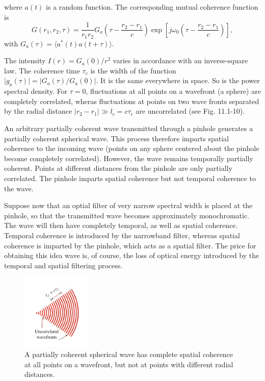 \documentclass{article}
\numberwithin{figure}{subsection}
\numberwithin{table}{subsection}
\begin{document}
where $ a(t) $ is a random function. The corresponding mutual coherence function is 
\begin{equation}
G(r_1, r_2, \tau) = \frac{1}{r_1 r_2} G_a (\tau - \frac{r_2 - r_1}{c}) \exp [j\omega_0 (\tau - \frac{r_2 - r_1}{c})],
\end{equation}
with $ G_a (\tau) = \langle a^\ast (t) a(t+ \tau) \rangle $.
\par The intensity $ I(r) = G_a (0) / r^2 $ varies in accordance with an inverse-square law. The coherence time $ \tau_c $ is the width of the function $ \lvert g_a (\tau) \rvert = \lvert G_a (\tau) / G_a (0) \rvert $. It is the same everywhere in space. So is the power spectral density. For $ \tau =0 $, fluctuations at all points on a wavefront (a sphere) are completely correlated, wheras fluctuations at points on two wave fronts separated by the radial distance $ \lvert r_2 -r_1 \rvert \gg l_c = c\tau_c $ are uncorrelated (see Fig. 11.1-10).
\par An arbitrary partially coherent wave transmitted through a pinhole generates a partially coherent spherical wave. This process therefore imparts spatial coherence to the incoming wave (points on any sphere centered about the pinhole become completely correlated). However, the wave remains temporally partially coherent. Points at different distances from the pinhole are only partially correlated. The pinhole imparts spatial coherence but not temporal coherence to the wave.
\par Suppose now that an optial filter of very narrow spectral width is placed at the pinhole, so that the transmitted wave becomes approximately monochromatic. The wave will then have completely temporal, as well as spatial coherence. Temporal coherence is introduced by the narrowband filter, whereas spatial coherence is imparted by the pinhole, which acts as a spatial filter. The price for obtaining this idea wave is, of course, the loss of optical energy introduced by the temporal and spatial filtering process.
 \begin{figure}[H]
\centering
\includegraphics[width=0.3\textwidth]{11_1_10.PNG}
\caption{A partially coherent spherical wave has complete spatial coherence at all points on a wavefront, but not at points with different radial distances.}
\label{fig: 11_1_10}
\end{figure}
\end{document}
